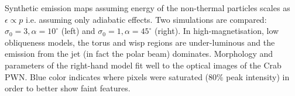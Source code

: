 Synthetic emission maps assuming energy of the non-thermal particles scales as  $\epsilon\propto p$  i.e. assuming only adiabatic effects.  Two simulations are compared: $\sigma_0=3,\alpha=10^\circ$ (left) and $\sigma_0=1,\alpha=45^\circ$ (right).  In high-magnetisation, low obliqueness models, the torus and wisp regions are under-luminous and the emission from the jet (in fact the polar beam) dominates.  Morphology and parameters of the right-hand model fit well to the optical images of the Crab PWN.  Blue color indicates where pixels were saturated ($80\%$ peak intensity) in order to better show faint features.